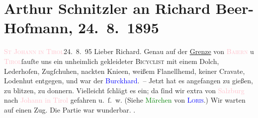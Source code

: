 

               \section[Arthur Schnitzler an Richard Beer-Hofmann, 24. 8. 1895]{ Arthur Schnitzler an Richard Beer-Hofmann, 24. 8. 1895}\nopagebreak{}\rehead{ }\normalsize\beginnumbering{} \toendnotes[C]{\smallbreak\pagebreak[2]} 
\toendnotes[C]{\smallbreak}\pstart
           \raggedleft{}{\pb}\textcolor{pink}{\textsc{St Johann in Tirol}}{}\ledrightnote{\textcolor{pink}{St. Johann in Tirol}}{\\}24. 8. 95\pend
           \pstart{}Lieber Richard.\pend\pstart
           Genau auf der \uline{Grenze} von \textcolor{pink}{\textsc{Baiern}}{}\ledrightnote{\textcolor{pink}{Bayern}} u \textcolor{pink}{\textsc{Tirol}}{}\ledrightnote{\textcolor{pink}{Tirol}}{ }ſauſte uns ein unheimlich gekleideter \textsc{Bicyclist} mit einem Dolch, Lederhoſen, Zugſchuhen, nackten
               Knieen, weißem Flanellhemd, keiner Cravate, Lodenhut entgegen, und war der \textcolor{blue}{Burckhard}{}\ledrightnote{\textcolor{blue}{Max Eugen Burckhard}}. –\pend
           \pstart
           Jetzt hat es angefangen zu gießen, zu blitzen, zu donnern. Vielleicht ſchlägt es ein;
                  da{\geminationn}{ }ſind wir extra von \textcolor{pink}{Salzburg}{}\ledrightnote{\textcolor{pink}{Salzburg}} nach {\pb}\textcolor{pink}{Johann in Tirol}{}\ledrightnote{\textcolor{pink}{St. Johann in Tirol}} gefahren u. ſ. w. (Siehe \textcolor{green}{Märchen}{}\ledrightnote{\textcolor{green}{Das Märchen der 672. Nacht}} von \textcolor{blue}{\textsc{Loris}}{}\ledrightnote{\textcolor{blue}{Hugo von Hofmannsthal}}.)\pend
           \pstart
           Wir warten auf einen Zug. Die Partie war wunderbar. \label{K_L00477_1v}\label{K_L00477_1h}.\pend
